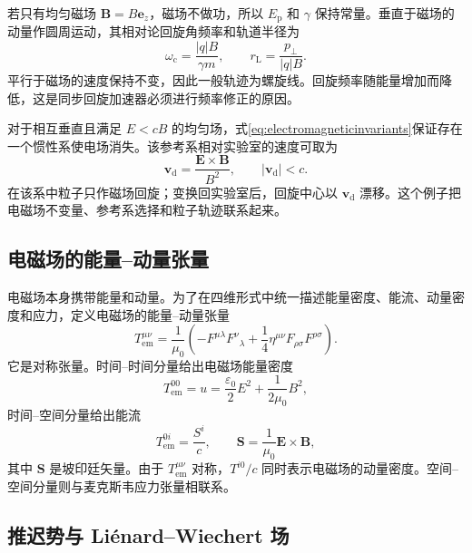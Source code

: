 \documentclass[style=classic,color=full]{lc-article}
\begin{document}
若只有均匀磁场 $\bm B=B\bm e_z$，磁场不做功，所以 $E_{\mathrm p}$ 和 $\gamma$ 保持常量。垂直于磁场的动量作圆周运动，其相对论回旋角频率和轨道半径为
\begin{equation}
  \omega_{\mathrm c}=\frac{\lvert q\rvert B}{\gamma m},
  \qquad
  r_{\mathrm L}=\frac{p_\perp}{\lvert q\rvert B}.
  \label{eq:relativisticcyclotron}
\end{equation}
平行于磁场的速度保持不变，因此一般轨迹为螺旋线。回旋频率随能量增加而降低，这是同步回旋加速器必须进行频率修正的原因。

对于相互垂直且满足 $E<cB$ 的均匀场，式\eqref{eq:electromagneticinvariants}保证存在一个惯性系使电场消失。该参考系相对实验室的速度可取为
\begin{equation}
  \bm v_{\mathrm d}
  =\frac{\bm E\times\bm B}{B^2},
  \qquad \lvert\bm v_{\mathrm d}\rvert<c.
  \label{eq:crossedfielddrift}
\end{equation}
在该系中粒子只作磁场回旋；变换回实验室后，回旋中心以 $\bm v_{\mathrm d}$ 漂移。这个例子把电磁场不变量、参考系选择和粒子轨迹联系起来\cite{griffiths,landau}。

\subsection{电磁场的能量--动量张量}

电磁场本身携带能量和动量。为了在四维形式中统一描述能量密度、能流、动量密度和应力，定义电磁场的能量--动量张量
\begin{equation}
  T_{\mathrm{em}}^{\mu\nu}
  =\frac{1}{\mu_0}
  \left(
    -F^{\mu\lambda}{F^\nu}_{\lambda}
    +\frac{1}{4}\eta^{\mu\nu}
      F_{\rho\sigma}F^{\rho\sigma}
  \right).
  \label{eq:emenergymomentumtensor}
\end{equation}
它是对称张量。时间--时间分量给出电磁场能量密度
\begin{equation}
  T_{\mathrm{em}}^{00}=u
  =\frac{\varepsilon_0}{2}E^2
  +\frac{1}{2\mu_0}B^2,
  \label{eq:emenergydensity}
\end{equation}
时间--空间分量给出能流
\begin{equation}
  T_{\mathrm{em}}^{0i}=\frac{S^i}{c},
  \qquad
  \bm S=\frac{1}{\mu_0}\bm E\times\bm B,
  \label{eq:poyntingvector}
\end{equation}
其中 $\bm S$ 是坡印廷矢量。由于 $T_{\mathrm{em}}^{\mu\nu}$ 对称，$T^{i0}/c$ 同时表示电磁场的动量密度。空间--空间分量则与麦克斯韦应力张量相联系。

\subsection{推迟势与 Li\'enard--Wiechert 场}
\end{document}
